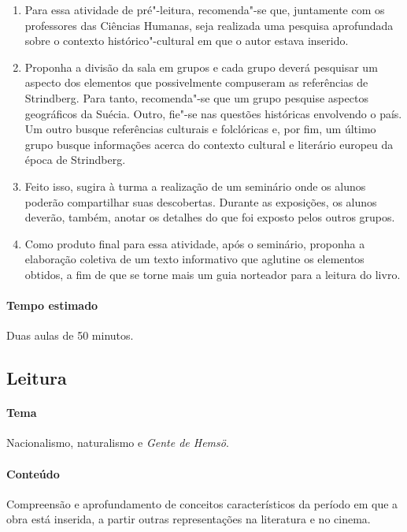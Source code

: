 \documentclass[12pt]{extarticle}
\begin{document}
\begin{enumerate}

\item
Para essa atividade de pré"-leitura, recomenda"-se que, juntamente com 
os professores das Ciências Humanas, seja realizada uma pesquisa 
aprofundada sobre o contexto histórico"-cultural
em que o autor estava inserido. 

\item
Proponha a divisão da sala em grupos e cada grupo deverá pesquisar um 
aspecto dos elementos que possivelmente compuseram as referências de 
Strindberg. Para tanto, recomenda"-se que um grupo pesquise aspectos 
geográficos da Suécia. Outro, fie"-se nas questões históricas envolvendo 
o país. Um outro busque referências culturais e folclóricas e, por fim, 
um último grupo busque informações acerca do contexto cultural e literário 
europeu da época de Strindberg. 

\item
Feito isso, sugira à turma a realização de um seminário onde os
alunos poderão compartilhar suas descobertas. Durante as exposições, os 
alunos deverão, também, anotar os detalhes do que foi exposto pelos 
outros grupos.

\item
Como produto final para essa atividade, após o seminário, proponha 
a elaboração coletiva de um texto informativo que aglutine os elementos 
obtidos, a fim de que se torne mais um guia norteador para a leitura do 
livro.

\end{enumerate}

\paragraph{Tempo estimado} Duas aulas de 50 minutos.


\subsection{Leitura}

\paragraph{Tema} Nacionalismo, naturalismo e \emph{Gente de Hemsö}.

\paragraph{Conteúdo} Compreensão e aprofundamento de conceitos 
característicos da período em que a obra está inserida, a partir outras representações na literatura e no cinema. 
\end{document}
